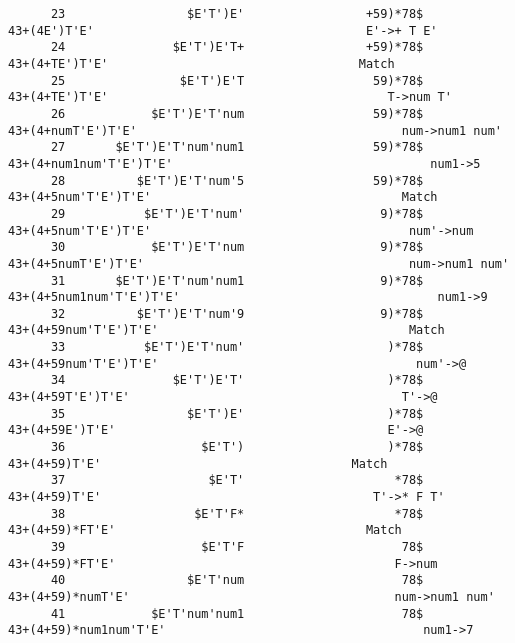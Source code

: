 \documentclass[UTF8]{ctexart}
\begin{document}
\begin{lstlisting}
      23                 $E'T')E'                 +59)*78$                         43+(4E')T'E'                                      E'->+ T E'
      24               $E'T')E'T+                 +59)*78$                         43+(4+TE')T'E'                                   Match
      25                $E'T')E'T                  59)*78$                        43+(4+TE')T'E'                                       T->num T'
      26            $E'T')E'T'num                  59)*78$                        43+(4+numT'E')T'E'                                     num->num1 num'
      27       $E'T')E'T'num'num1                  59)*78$                        43+(4+num1num'T'E')T'E'                                    num1->5
      28          $E'T')E'T'num'5                  59)*78$                        43+(4+5num'T'E')T'E'                                   Match
      29           $E'T')E'T'num'                   9)*78$                       43+(4+5num'T'E')T'E'                                    num'->num
      30            $E'T')E'T'num                   9)*78$                       43+(4+5numT'E')T'E'                                     num->num1 num'
      31       $E'T')E'T'num'num1                   9)*78$                       43+(4+5num1num'T'E')T'E'                                    num1->9
      32          $E'T')E'T'num'9                   9)*78$                       43+(4+59num'T'E')T'E'                                   Match
      33           $E'T')E'T'num'                    )*78$                      43+(4+59num'T'E')T'E'                                    num'->@
      34               $E'T')E'T'                    )*78$                      43+(4+59T'E')T'E'                                      T'->@
      35                 $E'T')E'                    )*78$                      43+(4+59E')T'E'                                      E'->@
      36                   $E'T')                    )*78$                      43+(4+59)T'E'                                   Match
      37                    $E'T'                     *78$                     43+(4+59)T'E'                                      T'->* F T'
      38                  $E'T'F*                     *78$                     43+(4+59)*FT'E'                                   Match
      39                   $E'T'F                      78$                    43+(4+59)*FT'E'                                       F->num
      40                 $E'T'num                      78$                    43+(4+59)*numT'E'                                     num->num1 num'
      41            $E'T'num'num1                      78$                    43+(4+59)*num1num'T'E'                                    num1->7

\end{lstlisting}
\end{document}
